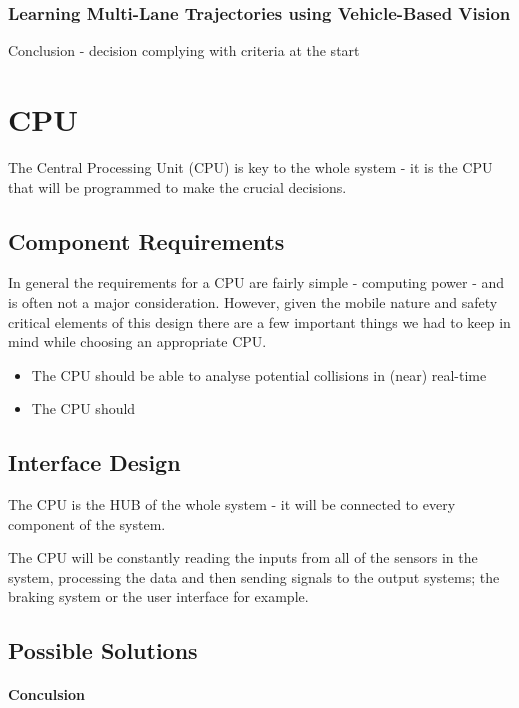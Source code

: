 \documentclass[a4paper]{report}
\begin{document}
\subsubsection{Learning Multi-Lane Trajectories using Vehicle-Based Vision \citep{multi-lane_traj}}

Conclusion - decision complying with criteria at the start

\section{CPU}
The Central Processing Unit (CPU) is key to the whole system - it is the CPU that will be programmed to make the crucial decisions.
\subsection{Component Requirements}
In general the requirements for a CPU are fairly simple - computing power - and is often not a major consideration. However, given the mobile nature and safety critical elements of this design there are a few important things we had to keep in mind while choosing an appropriate CPU.

\begin{itemize}
  \item The CPU should be able to analyse potential collisions in (near) real-time
  \item The CPU should 
\end{itemize}
\subsection{Interface Design}
The CPU is the HUB of the whole system - it will be connected to every component of the system.

The CPU will be constantly reading the inputs from all of the sensors in the system, processing the data and then sending signals to the output systems; the braking system or the user interface for example. 
\subsection{Possible Solutions}
\paragraph{Conculsion}

\end{document}
